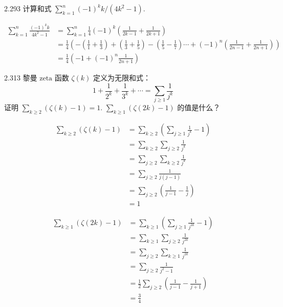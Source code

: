 \begin{problem}{2.29}{3}
  计算和式 \( \sum_{k=1}^n (-1)^k k / (4 k^2 - 1) \).
\end{problem}

\begin{align*}
  \sum_{k=1}^n \frac{(-1)^k k}{4 k^2 - 1} &= \sum_{k=1}^n \frac{1}{4} (-1)^k (\frac{1}{2k - 1} + \frac{1}{2k + 1}) \\
  &= \frac{1}{4} (-(\frac{1}{1} + \frac{1}{3}) + (\frac{1}{3} + \frac{1}{5}) - (\frac{1}{5} - \frac{1}{7}) \cdots + (-1)^n (\frac{1}{2n - 1} + \frac{1}{2n + 1})) \\
  &= \frac{1}{4} (-1 + (-1)^n \frac{1}{2n + 1})
\end{align*}

\begin{problem}{2.31}{3}
  黎曼 \( \text{zeta} \) 函数 \( \zeta (k) \) 定义为无限和式：
  \[
    1 + \frac{1}{2^k} + \frac{1}{3^k} + \cdots = \sum_{j \geq 1} \frac{1}{j^k}
  \]
  证明 \( \sum_{k \geq 2} (\zeta (k) - 1) = 1 \). \( \sum_{k \geq 1} (\zeta (2k) - 1) \) 的值是什么？
\end{problem}

\begin{align*}
  \sum_{k \geq 2} (\zeta (k) - 1) &= \sum_{k \geq 2} (\sum_{j \geq 1} \frac{1}{j^k} - 1) \\
  &= \sum_{k \geq 2} \sum_{j \geq 2} \frac{1}{j^k} \\
  &= \sum_{j \geq 2} \sum_{k \geq 2} \frac{1}{j^k} \\
  &= \sum_{j \geq 2} \frac{1}{j(j-1)} \\
  &= \sum_{j \geq 2} (\frac{1}{j-1} - \frac{1}{j}) \\
  &= 1
\end{align*}

\begin{align*}
  \sum_{k \geq 1} (\zeta(2k) - 1) &= \sum_{k \geq 1} (\sum_{j \geq 1} \frac{1}{j^{2k}} - 1) \\
  &= \sum_{k \geq 1} \sum_{j \geq 2} \frac{1}{j^{2k}} \\
  &= \sum_{j \geq 2} \sum_{k \geq 1} \frac{1}{j^{2k}} \\
  &= \sum_{j \geq 2} \frac{1}{j^2 - 1} \\
  &= \frac{1}{2} \sum_{j \geq 2} (\frac{1}{j-1} - \frac{1}{j+1}) \\
  &= \frac{3}{4}
\end{align*}
